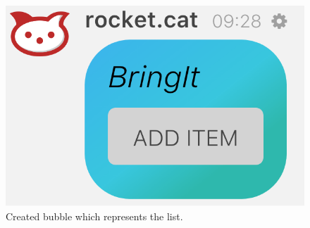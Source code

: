 \begin{figure}[H]
  \centering 
  \includegraphics[scale=0.3]{Sections/3-HowToUse/Images/bubble.png}
  \caption{Created bubble which represents the list.}
\end{figure}